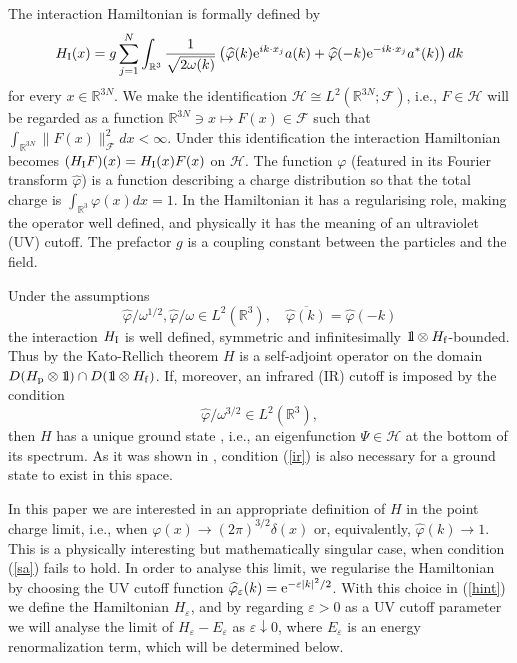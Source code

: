 \documentclass[11pt]{article}
\def\bbbone{{\mathchoice {\rm 1\mskip-4mu l} {\rm 1\mskip-4mu l}
{\rm 1\mskip-4.5mu l} {\rm 1\mskip-5mu l}}}
\def\one{\bbbone}
\providecommand{\eq}[1]{\begin{equation}\label{#1}}
\providecommand{\en}{\end{equation}}
\providecommand{\BR}{{\mathbb{R}^3 }}
\providecommand{\RR}{\mathbb{R}}
\providecommand{\LR}{{L^2(\BR)}}
\providecommand{\hn}{H}%
\providecommand{\ms}[1]{\mathscr{#1}}
\providecommand{\fff}{\mathscr{F}}
\providecommand{\add}{a^\ast}
\providecommand{\ov}[1]{\overline{#1}}
\providecommand{\hf}{H_{\rm f}}
\providecommand{\han}{{1/2}}
\providecommand{\hi}{H_{\rm I}}
\providecommand{\hp}{H_{\rm p}}
\providecommand{\hhh}{\ms H} %
\providecommand{\vp}{{\widehat \varphi}}
\providecommand{\vp}{\mathop{\mathrm{{\varphi}}}\nolimits}
\providecommand{\e}{{\rm e}}
\providecommand{\1}{\mathbb{1}}
\providecommand{\eps}{\varepsilon}
\newcounter {constant}
\begin{document}
The interaction Hamiltonian is formally  defined by
\begin{equation}
\label{hint}
\hi(x)  = g\sum_{j=1}^N \int_\BR \frac{1}{\sqrt{2\omega(k)}}
\left( \vp (k)\e^{ik\cdot x_j}  a(k) + \vp (-k)\e^{-ik\cdot x_j} \add(k)\right)  dk
\end{equation}
for every $x\in\RR^{3N}$. We make the identification $\hhh\cong L^2(\RR^{3N};\fff)$, i.e., $F\in \hhh$
will be regarded as a function  $\RR^{3N}\ni x\mapsto F(x)\in \fff$ such that $\int_{\RR^{3N}}\|F(x)\|^2_
\fff dx<\infty$. Under this identification the interaction Hamiltonian becomes $(\hi F)(x)=\hi(x) F(x)$ on
$\hhh$. The function $\varphi$ (featured in its Fourier transform $\vp$) is a function describing a charge
distribution so that the total charge is $\int_\BR \varphi(x) dx = 1$. In the Hamiltonian it has a
regularising role, making the operator well defined, and physically it has the meaning of an ultraviolet
(UV) cutoff. The prefactor $g$ is a coupling constant between the particles and the field.

Under the assumptions
\begin{equation}
{\vp }/{\omega^{1/2}}, {\vp }/{\omega}  \in   \LR ,\quad \ov{\vp(k)}=\vp(-k)
\label{sa}
\end{equation}
the interaction $\hi$ is well defined, symmetric and infinitesimally $\one\otimes \hf $-bounded. Thus
by the Kato-Rellich theorem $\hn$ is a self-adjoint operator on the domain $D(\hp\otimes \one) \cap
D(\one \otimes \hf )$. If, moreover, an infrared (IR) cutoff is imposed by the condition
\begin{equation}
{\vp }/{\omega^{3/2}}  \in  \LR,
\label{ir}
\end{equation}
then $\hn$ has a unique ground state \cite{spo98,bfs98,ger00,ara01,sas05}, i.e., an eigenfunction $\Psi
\in \hhh$ at the bottom of its spectrum. As it was shown in \cite{lms02,dg04,hir06}, condition (\ref{ir})
is also necessary for a ground state to exist in this space.

In this paper we are interested in an appropriate definition of $\hn$ in the point charge limit, i.e., when
$\varphi(x) \to (2\pi)^{3/2}\delta(x)$ or, equivalently, $\vp (k) \to 1 $. This is a physically interesting
but mathematically singular case, when condition (\ref{sa}) fails to hold. In order to analyse this limit,
we regularise the Hamiltonian by choosing the UV cutoff function $\vp_\eps(k)=\e^{-\eps|k|^2/2}$. With this
choice in (\ref{hint}) we define the Hamiltonian $\hn_\eps$, and by regarding $\eps>0$ as a UV cutoff parameter
we will analyse the limit of $\hn_\eps-E_\eps$ as $\eps\downarrow 0$, where $E_\eps$ is an energy renormalization
term, which will be determined below.
\end{document}
